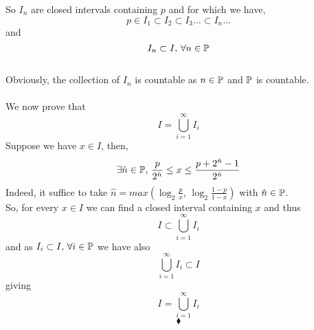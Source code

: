 So $I_n$  are closed intervals containing $p$ and for which we have,
$$p\in I_1\subset I_2\subset I_3\dots \subset I_n\dots $$
and 
$$I_n\subset I,\, \forall n\in \mathbb{P}$$\\
Obviously, the collection of $I_n$ is countable as $n\in \mathbb{P}$ and $\mathbb{P}$ is countable.
\\\\
We now prove that 
$$I=\bigcup^{\infty}_{i=1}I_i $$
Suppose we have $x\in I$, then, $$\exists \hat{n}\in \mathbb{P},\, \frac{p}{2^{\hat{n}}}\leq x\leq \frac{p+2^{\hat{n}}-1}{2^{\hat{n}}}$$
Indeed, it suffice to take $\hat{n}= max(\log_2 \frac{p}{x},\, \log_2 \frac{1-p}{1-x})$ with $\hat{n}\in\mathbb{P}$.\\
So, for every $x\in I$ we can find a closed interval containing $x$ and thus $$I\subset  \bigcup^{\infty}_{i=1}I_i$$
and as $I_i\subset I,\, \forall i\in \mathbb{P}$ we have also 
$$\bigcup^{\infty}_{i=1}I_i\subset  I$$
giving
$$I=\bigcup^{\infty}_{i=1}I_i$$
$$\blacklozenge$$


